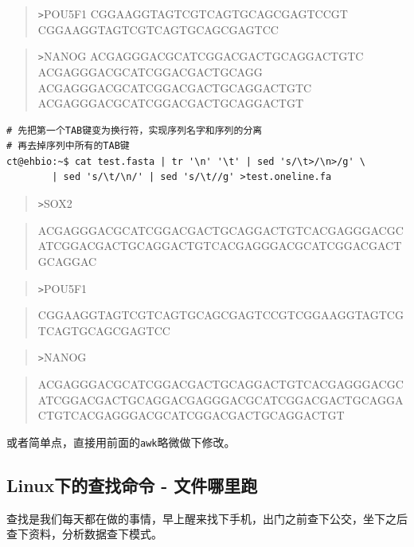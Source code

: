 \documentclass[]{article}
\numberwithin{figure}{section}
\numberwithin{table}{section}
\begin{document}
\begin{quote}
\texttt{\textgreater{}}POU5F1 CGGAAGGTAGTCGTCAGTGCAGCGAGTCCGT CGGAAGGTAGTCGTCAGTGCAGCGAGTCC
\end{quote}

\begin{quote}
\texttt{\textgreater{}}NANOG ACGAGGGACGCATCGGACGACTGCAGGACTGTC ACGAGGGACGCATCGGACGACTGCAGG ACGAGGGACGCATCGGACGACTGCAGGACTGTC ACGAGGGACGCATCGGACGACTGCAGGACTGT
\end{quote}

\begin{verbatim}
# 先把第一个TAB键变为换行符，实现序列名字和序列的分离
# 再去掉序列中所有的TAB键
ct@ehbio:~$ cat test.fasta | tr '\n' '\t' | sed 's/\t>/\n>/g' \
		| sed 's/\t/\n/' | sed 's/\t//g' >test.oneline.fa
\end{verbatim}

\begin{quote}
\texttt{\textgreater{}}SOX2
\end{quote}

\begin{quote}
ACGAGGGACGCATCGGACGACTGCAGGACTGTCACGAGGGACGCATCGGACGACTGCAGGACTGTCACGAGGGACGCATCGGACGACTGCAGGAC
\end{quote}

\begin{quote}
\texttt{\textgreater{}}POU5F1
\end{quote}

\begin{quote}
CGGAAGGTAGTCGTCAGTGCAGCGAGTCCGTCGGAAGGTAGTCGTCAGTGCAGCGAGTCC
\end{quote}

\begin{quote}
\texttt{\textgreater{}}NANOG
\end{quote}

\begin{quote}
ACGAGGGACGCATCGGACGACTGCAGGACTGTCACGAGGGACGCATCGGACGACTGCAGGACGAGGGACGCATCGGACGACTGCAGGACTGTCACGAGGGACGCATCGGACGACTGCAGGACTGT
\end{quote}

或者简单点，直接用前面的\texttt{awk}略微做下修改。

\hypertarget{linux_search}{%
\subsection{Linux下的查找命令 - 文件哪里跑}\label{linux_search}}

查找是我们每天都在做的事情，早上醒来找下手机，出门之前查下公交，坐下之后查下资料，分析数据查下模式。
\end{document}
